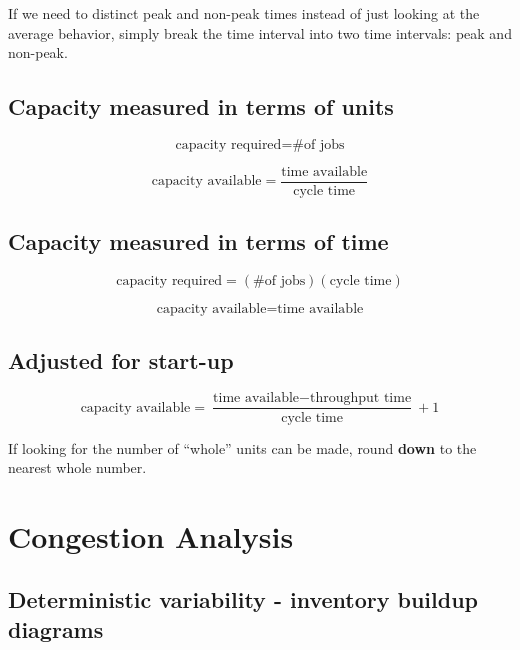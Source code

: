 \documentclass[11pt]{article}
\begin{document}
If we need to distinct peak and non-peak times instead of just looking at the average behavior, simply break the time
interval into two time intervals: peak and non-peak.

\subsection{Capacity measured in terms of units}

\begin{equation}
    \text{capacity required} = \text{\# of jobs}
\end{equation}

\begin{equation}
    \text{capacity available} = \frac{\text{time available}}{\text{cycle time}}
\end{equation}

\subsection{Capacity measured in terms of time}

\begin{equation}
    \text{capacity required} = (\text{\# of jobs})(\text{cycle time})
\end{equation}

\begin{equation}
    \text{capacity available} = \text{time available}
\end{equation}

\subsection{Adjusted for start-up}

\begin{equation}
    \text{capacity available} = \frac{\text{time available} - \text{throughput time}}{\text{cycle time}} + 1
\end{equation}

If looking for the number of ``whole'' units can be made, round \textbf{down} to the nearest whole number.

\section{Congestion Analysis}

\subsection{Deterministic variability - inventory buildup diagrams}
\end{document}
